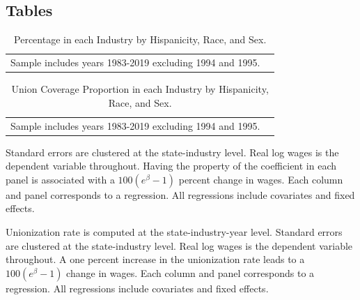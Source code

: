 \documentclass[11pt]{article}
\begin{document}
{\begin{landscape}
\begin{table}[ht!]
\begin{tabular}{c c}
    \end{tabular}
\end{table}
\end{landscape}

\pagebreak
\begin{landscape}
\section*{Tables}
\small{}
\end{landscape}

\pagebreak
\begin{landscape}
\small{\begin{table}[h!]
    \centering
    \caption{Percentage in each Industry by Hispanicity, Race, and Sex.}\label{tab:nindtab}
    \fontsize{10}{11}\selectfont
\begin{tabular}{l*{8}{c}}

\hline\hline
\multicolumn{8}{l}{\footnotesize Sample includes years 1983-2019 excluding 1994 and 1995.}\\
\end{tabular}
\end{table}}

\small{\begin{table}[h!]
    \centering
    \caption{Union Coverage Proportion in each Industry by Hispanicity, Race, and Sex.}\label{tab:unindtab}
    \fontsize{10}{11}\selectfont
\begin{tabular}{l*{8}{c}}

\hline\hline
\multicolumn{8}{l}{\footnotesize Sample includes years 1983-2019 excluding 1994 and 1995.}\\
\end{tabular}
\end{table}}
\end{landscape}

\pagebreak
\small{}
\footnotesize{Standard errors are clustered at the state-industry level. Real log wages is the dependent variable throughout. Having the property of the coefficient in each panel is associated with a $ 100(e^\beta - 1) $ percent change in wages. Each column and panel corresponds to a regression. All regressions include covariates and fixed effects.}

\pagebreak
\small{}
\footnotesize{Unionization rate is computed at the state-industry-year level. Standard errors are clustered at the state-industry level. Real log wages is the dependent variable throughout. A one percent increase in the unionization rate leads to a $100(e^{\beta} - 1)$ change in wages. Each column and panel corresponds to a regression. All regressions include covariates and fixed effects.}

}
\end{document}
